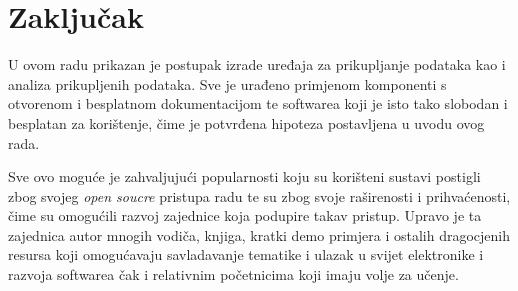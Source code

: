 \chapter{Zaključak}\label{ch:Zakljucak}
U ovom radu prikazan je postupak izrade uređaja za prikupljanje podataka kao i analiza prikupljenih podataka.
Sve je urađeno primjenom komponenti s otvorenom i besplatnom dokumentacijom te softwarea koji je isto tako slobodan i besplatan za korištenje, čime je potvrđena hipoteza postavljena u uvodu ovog rada.

Sve ovo moguće je zahvaljujući popularnosti koju su korišteni sustavi postigli zbog svojeg \textit{open soucre} pristupa radu te su zbog svoje raširenosti i prihvaćenosti, čime su omogućili razvoj zajednice koja podupire takav pristup.
Upravo je ta zajednica autor mnogih vodiča, knjiga, kratki demo primjera i ostalih dragocjenih resursa koji omogućavaju savladavanje tematike i ulazak u svijet elektronike i razvoja softwarea čak i relativnim početnicima koji imaju volje za učenje.